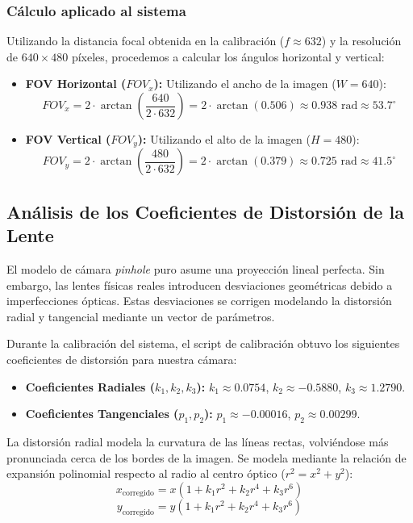 \documentclass[12pt,a4paper]{article}
\begin{document}
\subsubsection{Cálculo aplicado al sistema}

Utilizando la distancia focal obtenida en la calibración ($f \approx 632$) y la resolución de $640 \times 480$ píxeles, procedemos a calcular los ángulos horizontal y vertical:

\begin{itemize}
    \item \textbf{FOV Horizontal ($FOV_x$):}
    Utilizando el ancho de la imagen ($W = 640$):
    \[
    FOV_x = 2 \cdot \arctan\left(\frac{640}{2 \cdot 632}\right) = 2 \cdot \arctan(0.506) \approx 0.938 \text{ rad} \approx 53.7^\circ
    \]

    \item \textbf{FOV Vertical ($FOV_y$):}
    Utilizando el alto de la imagen ($H = 480$):
    \[
    FOV_y = 2 \cdot \arctan\left(\frac{480}{2 \cdot 632}\right) = 2 \cdot \arctan(0.379) \approx 0.725 \text{ rad} \approx 41.5^\circ
    \]
\end{itemize}

\subsection{Análisis de los Coeficientes de Distorsión de la Lente}
El modelo de cámara \textit{pinhole} puro asume una proyección lineal perfecta. Sin embargo, las lentes físicas reales introducen desviaciones geométricas debido a imperfecciones ópticas. Estas desviaciones se corrigen modelando la distorsión radial y tangencial mediante un vector de parámetros.

Durante la calibración del sistema, el script de calibración obtuvo los siguientes coeficientes de distorsión para nuestra cámara:
\begin{itemize}
    \item \textbf{Coeficientes Radiales ($k_1, k_2, k_3$):} $k_1 \approx 0.0754$, $k_2 \approx -0.5880$, $k_3 \approx 1.2790$.
    \item \textbf{Coeficientes Tangenciales ($p_1, p_2$):} $p_1 \approx -0.00016$, $p_2 \approx 0.00299$.
\end{itemize}

La distorsión radial modela la curvatura de las líneas rectas, volviéndose más pronunciada cerca de los bordes de la imagen. Se modela mediante la relación de expansión polinomial respecto al radio al centro óptico ($r^2 = x^2 + y^2$):
\begin{equation}
    x_{\text{corregido}} = x(1 + k_1 r^2 + k_2 r^4 + k_3 r^6)
\end{equation}
\begin{equation}
    y_{\text{corregido}} = y(1 + k_1 r^2 + k_2 r^4 + k_3 r^6)
\end{equation}
\end{document}
